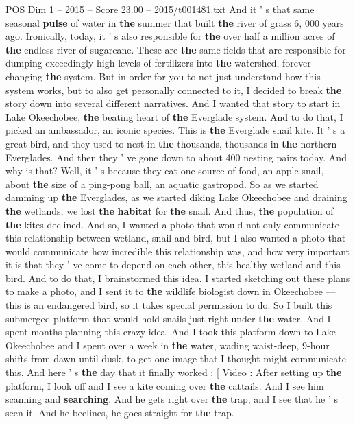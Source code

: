 \begin{textsample}{POS Dim 1 – 2015 – Score 23.00 – 2015/t001481.txt}
And it ' s that same seasonal \textbf{pulse} of water in \textbf{the} summer that built \textbf{the} river of grass 6, 000 years ago.
Ironically, today, it ' s also responsible for \textbf{the} over half a million acres of \textbf{the} endless river of sugarcane.
These are \textbf{the} same fields that are responsible for dumping exceedingly high levels of fertilizers into \textbf{the} watershed, forever changing \textbf{the} system.
But in order for you to not just understand how this system works, but to also get personally connected to it, I decided to break \textbf{the} story down into several different narratives.
And I wanted that story to start in Lake Okeechobee, \textbf{the} beating heart of \textbf{the} Everglade system.
And to do that, I picked an ambassador, an iconic species.
This is \textbf{the} Everglade snail kite.
It ' s a great bird, and they used to nest in \textbf{the} thousands, thousands in \textbf{the} northern Everglades.
And then they ' ve gone down to about 400 nesting pairs today.
And why is that?
Well, it ' s because they eat one source of food, an apple snail, about \textbf{the} size of a ping-pong ball, an aquatic gastropod.
So as we started damming up \textbf{the} Everglades, as we started diking Lake Okeechobee and draining \textbf{the} wetlands, we lost \textbf{the} \textbf{habitat} for \textbf{the} snail.
And thus, \textbf{the} population of \textbf{the} kites declined.
And so, I wanted a photo that would not only communicate this relationship between wetland, snail and bird, but I also wanted a photo that would communicate how incredible this relationship was, and how very important it is that they ' ve come to depend on each other, this healthy wetland and this bird.
And to do that, I brainstormed this idea.
I started sketching out these plans to make a photo, and I sent it to \textbf{the} wildlife biologist down in Okeechobee — this is an endangered bird, so it takes special permission to do.
So I built this submerged platform that would hold snails just right under \textbf{the} water.
And I spent months planning this crazy idea.
And I took this platform down to Lake Okeechobee and I spent over a week in \textbf{the} water, wading waist-deep, 9-hour shifts from dawn until dusk, to get one image that I thought might communicate this.
And here ' s \textbf{the} day that it finally worked : [ Video : After setting up \textbf{the} platform, I look off and I see a kite coming over \textbf{the} cattails.
And I see him scanning and \textbf{searching}.
And he gets right over \textbf{the} trap, and I see that he ' s seen it.
And he beelines, he goes straight for \textbf{the} trap.

\end{textsample}
